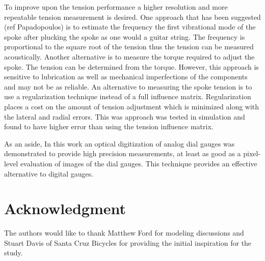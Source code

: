 \documentclass[journal]{IEEEtran}
\begin{document}
To improve upon the tension performance a higher resolution and more repeatable tension measurement is desired. One approach that has been suggested (ref Papadopoulos) is to estimate the frequency the first vibrational mode of the spoke after plucking the spoke as one would a guitar string.  The frequency is proportional to the square root of the tension thus the tension can be measured acoustically.  Another alternative is to measure the torque required to adjust the spoke. The tension can be determined from the torque. However, this approach is sensitive to lubrication as well as mechanical imperfections of the components and may not be as reliable. An alternative to measuring the spoke tension is to use a regularization technique instead of a full influence matrix.  Regularization places a cost on the amount of tension adjustment which is minimized along with the lateral and radial errors.  This was approach was tested in simulation and found to have higher error than using the tension influence matrix. 

As an aside, In this work an optical digitization of analog dial gauges was demonstrated to provide high precision measurements, at least as good as a pixel-level evaluation of images of the dial gauges.  This technique provides an effective alternative to digital gauges. 


\section*{Acknowledgment}

The authors would like to thank Matthew Ford for modeling discussions and Stuart Davis of Santa Cruz Bicycles for providing the initial inspiration for the study.


\ifCLASSOPTIONcaptionsoff
  \newpage
\fi







\end{document}
